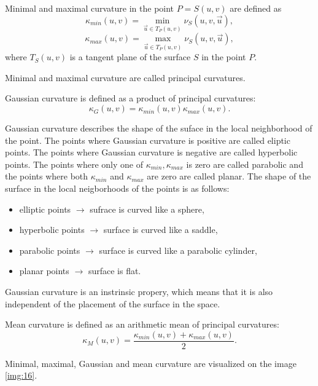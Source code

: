 \begin{definition}
    Minimal and maximal curvature in the point $P = S(u,v)$ are defined as
    $$\kappa_{min}(u,v) = \min_{\overrightarrow{u} \in T_P(u, v)} \nu_S(u, v, \overrightarrow{u}),$$
    $$\kappa_{max}(u,v) = \max_{\overrightarrow{u} \in T_P(u, v)} \nu_S(u, v, \overrightarrow{u}),$$
    where $T_S(u, v)$ is a tangent plane of the surface $S$ in the point $P$.

    Minimal and maximal curvature are called principal curvatures. 
\end{definition}

\begin{definition}
    Gaussian curvature is defined as a product of principal curvatures:
    $$\kappa_G(u, v) = \kappa_{min}(u,v) \kappa_{max}(u,v).$$
\end{definition}

Gaussian curvature describes the shape of the suface in the local neighborhood of the point.
The points where Gaussian curvature is positive are called eliptic points.
The points where Gaussian curvature is negative are called hyperbolic points.
The points where only one of $\kappa_{min}, \kappa_{max}$ is zero are called parabolic and
the points where both $\kappa_{min}$ and $\kappa_{max}$ are zero are called planar.
The shape of the surface in the local neigborhoods of the points is as follows:
\begin{itemize}
    \item {elliptic points $\longrightarrow$ sufrace is curved like a sphere,}
    \item {hyperbolic points $\longrightarrow$ surface is curved like a saddle,}
    \item {parabolic points $\longrightarrow$ surface is curved like a parabolic cylinder,}
    \item {planar points $\longrightarrow$ surface is flat.}

\end{itemize}
Gaussian curvature is an
instrinsic propery, which means that it is also independent of the placement of the surface in the space.

\begin{definition}
    Mean curvature is defined as an arithmetic mean of principal curvatures:
    $$\kappa_M(u, v) = \frac{\kappa_{min}(u,v) + \kappa_{max}(u,v)}{2}.$$
\end{definition}

Minimal, maximal, Gaussian and mean curvature are visualized on the image \ref{img:16}.

